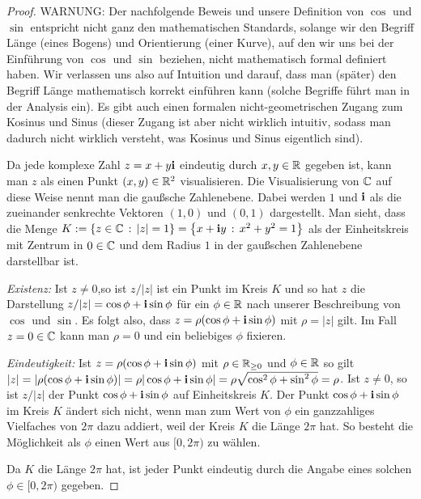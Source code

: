 \begin{proof}  
	{\color{red} WARNUNG:} Der nachfolgende Beweis und unsere Definition von $\cos$ und $\sin$ entspricht nicht ganz den mathematischen Standards, solange wir den Begriff  Länge (eines Bogens) und Orientierung (einer Kurve), auf den  wir uns bei der Einführung von $\cos$ und $\sin$ beziehen, nicht mathematisch formal definiert haben. Wir verlassen uns also auf Intuition und darauf, dass man (später) den Begriff Länge mathematisch korrekt einführen kann (solche Begriffe führt man in der Analysis ein). Es gibt auch einen formalen nicht-geometrischen Zugang zum Kosinus und Sinus (dieser Zugang ist aber nicht wirklich intuitiv, sodass man dadurch nicht wirklich versteht, was Kosinus und Sinus eigentlich sind). 
	
	Da jede komplexe Zahl $z = x + y \mathbf{i}$ eindeutig durch $x, y \in \mathbb{R}$ gegeben ist, kann man $z$ als einen Punkt $(x,y) \in \mathbb{R}^2$ visualisieren. Die Visualisierung von $\mathbb{C}$ auf diese Weise nennt man die gaußsche Zahlenebene. Dabei werden $1$ und $\mathbf{i}$ als die zueinander senkrechte Vektoren $(1,0)$ und $(0,1)$ dargestellt. Man sieht, dass die Menge $K := \left\{ z \in \mathbb{C} \,:\, |z|=1 \right\} = \left\{  x+ \mathbf{i} y \,:\, x^2 + y^2 =1 \right\}$ als  der Einheitskreis mit Zentrum in $0 \in \mathbb{C}$ und dem Radius $1$ in der gaußschen Zahlenebene darstellbar ist. 
	
	\emph{Existenz:} Ist $z \ne 0$,so ist $z / |z|$ ist ein Punkt im Kreis $K$ und so hat $z$ die Darstellung $ z / |z| = \cos \phi + \mathbf{i} \sin \phi$ für ein $\phi \in \mathbb{R}$ nach unserer Beschreibung von $\cos$ und $\sin$. Es folgt also, dass $z = \rho ( \cos \phi + \mathbf{i} \sin \phi)$ mit $\rho = |z|$ gilt. Im Fall $z= 0 \in \mathbb{C}$ kann man $\rho =0$ und ein beliebiges $\phi$ fixieren. 
	
	\emph{Eindeutigkeit:} Ist $z = \rho (\cos \phi + \mathbf{i} \sin \phi)$ mit $\rho \in \mathbb{R}_{\ge 0}$ und $\phi \in \mathbb{R}$ so gilt $|z| = | \rho (\cos \phi + \mathbf{i} \sin \phi) | = \rho | \cos \phi + \mathbf{i} \sin \phi| = \rho \sqrt{ \cos^2 \phi + \sin^2\phi } = \rho$. Ist $z \ne 0$, so ist 
	$ z/ |z|$ der Punkt $\cos \phi + \mathbf{i} \sin \phi$ auf Einheitskreis $K$. Der Punkt $\cos \phi + \mathbf{i} \sin \phi$ im Kreis $K$ ändert sich nicht, wenn man zum Wert von $\phi$  ein ganzzahliges Vielfaches von $2 \pi$ dazu addiert, weil der Kreis $K$ die Länge $2\pi$ hat. So besteht die Möglichkeit als $\phi$ einen Wert aus $[0,2 \pi)$ zu wählen. 
	
	 Da $K$ die Länge $2\pi$ hat, ist jeder Punkt eindeutig durch die Angabe eines solchen $\phi \in [0,2 \pi)$ gegeben. 
\end{proof} 

